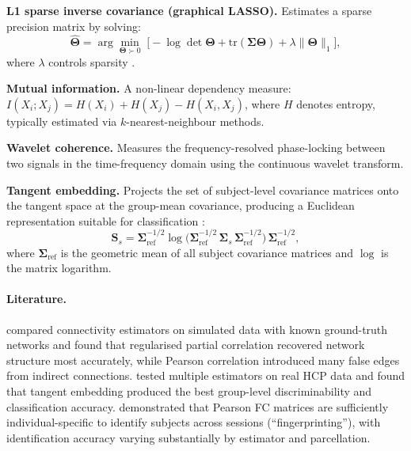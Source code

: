 \documentclass[11pt,a4paper]{article}
\begin{document}
\textbf{L1 sparse inverse covariance (graphical LASSO).}  Estimates a sparse precision matrix by solving:
\begin{equation}
    \hat{\boldsymbol\Theta} = \arg\min_{\boldsymbol\Theta \succ 0} \;\bigl[-\log\det\boldsymbol\Theta + \mathrm{tr}(\boldsymbol\Sigma\boldsymbol\Theta) + \lambda\|\boldsymbol\Theta\|_1\bigr],
\end{equation}
where $\lambda$ controls sparsity \citep{friedman2008}.

\textbf{Mutual information.}  A non-linear dependency measure: $I(X_i; X_j) = H(X_i) + H(X_j) - H(X_i, X_j)$, where $H$ denotes entropy, typically estimated via $k$-nearest-neighbour methods.

\textbf{Wavelet coherence.}  Measures the frequency-resolved phase-locking between two signals in the time-frequency domain using the continuous wavelet transform.

\textbf{Tangent embedding.}  Projects the set of subject-level covariance matrices onto the tangent space at the group-mean covariance, producing a Euclidean representation suitable for classification \citep{varoquaux2010}:
\begin{equation}
    \mathbf{S}_s = \boldsymbol\Sigma_{\mathrm{ref}}^{-1/2} \log\!\bigl(\boldsymbol\Sigma_{\mathrm{ref}}^{-1/2}\,\boldsymbol\Sigma_s\,\boldsymbol\Sigma_{\mathrm{ref}}^{-1/2}\bigr)\,\boldsymbol\Sigma_{\mathrm{ref}}^{-1/2},
\end{equation}
where $\boldsymbol\Sigma_{\mathrm{ref}}$ is the geometric mean of all subject covariance matrices and $\log$ is the matrix logarithm.

\paragraph{Literature.}
\citet{smith2011} compared connectivity estimators on simulated data with known ground-truth networks and found that regularised partial correlation recovered network structure most accurately, while Pearson correlation introduced many false edges from indirect connections.  \citet{pervaiz2020} tested multiple estimators on real HCP data and found that tangent embedding produced the best group-level discriminability and classification accuracy.  \citet{finn2015} demonstrated that Pearson FC matrices are sufficiently individual-specific to identify subjects across sessions (``fingerprinting''), with identification accuracy varying substantially by estimator and parcellation.
\end{document}
